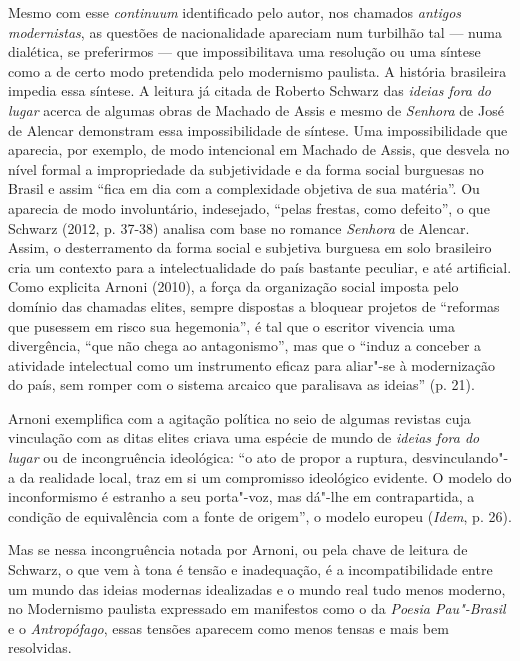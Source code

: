 Mesmo com esse \emph{continuum} identificado pelo autor, nos chamados
\emph{antigos modernistas}, as questões de nacionalidade apareciam num
turbilhão tal --- numa dialética, se preferirmos --- que impossibilitava
uma resolução ou uma síntese como a de certo modo pretendida pelo
modernismo paulista. A história brasileira impedia essa síntese. A
leitura já citada de Roberto Schwarz das \emph{ideias} \emph{fora}
\emph{do} \emph{lugar} acerca de algumas obras de Machado de Assis e
mesmo de \emph{Senhora} de José de Alencar demonstram essa
impossibilidade de síntese. Uma impossibilidade que aparecia, por
exemplo, de modo intencional em Machado de Assis, que desvela no nível
formal a impropriedade da subjetividade e da forma social burguesas no
Brasil e assim ``fica em dia com a complexidade objetiva de sua
matéria''. Ou aparecia de modo involuntário, indesejado, ``pelas
frestas, como defeito'', o que Schwarz (2012, p. 37-38) analisa com base
no romance \emph{Senhora} de Alencar. Assim, o desterramento da forma
social e subjetiva burguesa em solo brasileiro cria um contexto para a
intelectualidade do país bastante peculiar, e até artificial. Como
explicita Arnoni (2010), a força da organização social imposta pelo
domínio das chamadas elites, sempre dispostas a bloquear projetos de
``reformas que pusessem em risco sua hegemonia'', é tal que o escritor
vivencia uma divergência, ``que não chega ao antagonismo'', mas que o
``induz a conceber a atividade intelectual como um instrumento eficaz
para aliar"-se à modernização do país, sem romper com o sistema arcaico
que paralisava as ideias'' (p. 21).

Arnoni exemplifica com a agitação política no seio de algumas revistas
cuja vinculação com as ditas elites criava uma espécie de mundo de
\emph{ideias fora do lugar} ou de incongruência ideológica: ``o ato de
propor a ruptura, desvinculando"-a da realidade local, traz em si um
compromisso ideológico evidente. O modelo do inconformismo é estranho a
seu porta"-voz, mas dá"-lhe em contrapartida, a condição de equivalência
com a fonte de origem'', o modelo europeu (\emph{Idem}, p. 26).

Mas se nessa incongruência notada por Arnoni, ou pela chave de leitura
de Schwarz, o que vem à tona é tensão e inadequação, é a
incompatibilidade entre um mundo das ideias modernas idealizadas e o
mundo real tudo menos moderno, no Modernismo paulista expressado em
manifestos como o da \emph{Poesia Pau"-Brasil} e o \emph{Antropófago},
essas tensões aparecem como menos tensas e mais bem resolvidas.

